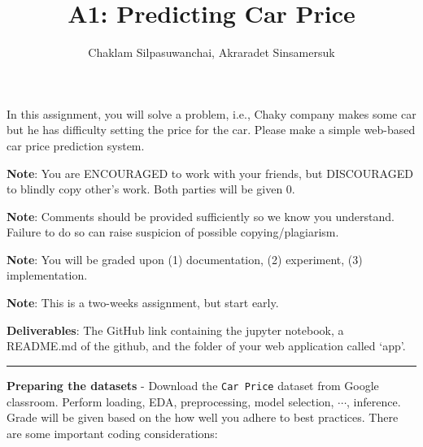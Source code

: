 \documentclass{homework}
\author{Chaklam Silpasuwanchai, Akraradet Sinsamersuk}
\title{A1: Predicting Car Price}
\begin{document}
 \maketitle

In this assignment, you will solve a problem, i.e., Chaky company makes some car but he has difficulty setting the price for the car.  Please make a simple web-based car price prediction system.

\vspace{0.01\textheight}

\textbf{Note}:  You are ENCOURAGED to work with your friends, but DISCOURAGED to blindly copy other's work.  Both parties will be given 0.

\textbf{Note}:  Comments should be provided sufficiently so we know you understand.  Failure to do so can raise suspicion of possible copying/plagiarism.

\textbf{Note}:  You will be graded upon (1) documentation, (2) experiment, (3) implementation.

\textbf{Note}:  This is a two-weeks assignment, but start early.

\textbf{Deliverables}: The GitHub link containing the jupyter notebook, a README.md of the github, and the folder of your web application called `app'.

\vspace{0.01\textheight}

\hrule

\task \textbf{Preparing the datasets} - Download the \texttt{Car Price} dataset from Google classroom. Perform loading, EDA, preprocessing, model selection, $\cdots$, inference.  Grade will be given based on the how well you adhere to best practices. There are some important coding considerations:
\end{document}
